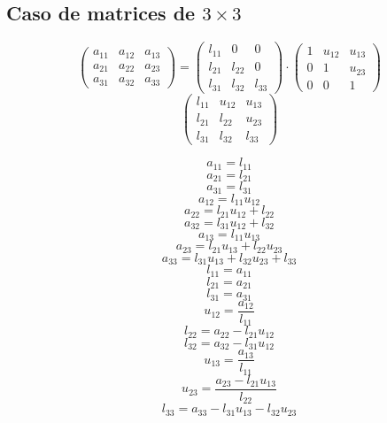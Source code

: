 \documentclass[10pt,a4paper,dvipdfmx]{article}
\begin{document}
\subsection{Caso de matrices de $3\times 3$ }
$$ \left( 
\begin{array}{ccc}
a_{{1}{1}} & a_{{1}{2}} & a_{{1}{3}} \\
a_{{2}{1}} & a_{{2}{2}} & a_{{2}{3}} \\
a_{{3}{1}} & a_{{3}{2}} & a_{{3}{3}} 
 \end{array}
\right)
 = \left( 
\begin{array}{ccc}
l_{{1}{1}} & 0 & 0 \\
l_{{2}{1}} & l_{{2}{2}} & 0 \\
l_{{3}{1}} & l_{{3}{2}} & l_{{3}{3}} 
 \end{array}
\right)
 \cdot \left( 
\begin{array}{ccc}
1 & u_{{1}{2}} & u_{{1}{3}} \\
0 & 1 & u_{{2}{3}} \\
0 & 0 & 1 
 \end{array}
\right)
 $$
$$ \left( 
\begin{array}{ccc}
l_{{1}{1}} & u_{{1}{2}} & u_{{1}{3}} \\
l_{{2}{1}} & l_{{2}{2}} & u_{{2}{3}} \\
l_{{3}{1}} & l_{{3}{2}} & l_{{3}{3}} 
 \end{array}
\right)
 $$
\begin{multicols}{2}
$$ a_{{1}{1}} = l_{{1}{1}} $$
$$ a_{{2}{1}} = l_{{2}{1}} $$
$$ a_{{3}{1}} = l_{{3}{1}} $$
$$ a_{{1}{2}} = l_{{1}{1}} u_{{1}{2}} $$
$$ a_{{2}{2}} = l_{{2}{1}} u_{{1}{2}} + l_{{2}{2}} $$
$$ a_{{3}{2}} = l_{{3}{1}} u_{{1}{2}} + l_{{3}{2}} $$
$$ a_{{1}{3}} = l_{{1}{1}} u_{{1}{3}} $$
$$ a_{{2}{3}} = l_{{2}{1}} u_{{1}{3}} + l_{{2}{2}} u_{{2}{3}} $$
$$ a_{{3}{3}} = l_{{3}{1}} u_{{1}{3}} + l_{{3}{2}} u_{{2}{3}} + l_{{3}{3}} $$
\vfill\null
\columnbreak
$$ l_{{1}{1}} = a_{{1}{1}} $$
$$ l_{{2}{1}} = a_{{2}{1}} $$
$$ l_{{3}{1}} = a_{{3}{1}} $$
$$ u_{{1}{2}} = \dfrac{a_{{1}{2}}}{l_{{1}{1}}} $$
$$ l_{{2}{2}} = a_{{2}{2}}- l_{{2}{1}} u_{{1}{2}} $$
$$ l_{{3}{2}} = a_{{3}{2}}- l_{{3}{1}} u_{{1}{2}} $$
$$ u_{{1}{3}} = \dfrac{a_{{1}{3}}}{l_{{1}{1}}} $$
$$ u_{{2}{3}} = \dfrac{a_{{2}{3}}- l_{{2}{1}} u_{{1}{3}}}{l_{{2}{2}}} $$
$$ l_{{3}{3}} = a_{{3}{3}}- l_{{3}{1}} u_{{1}{3}}- l_{{3}{2}} u_{{2}{3}} $$
\end{multicols}
\end{document}
